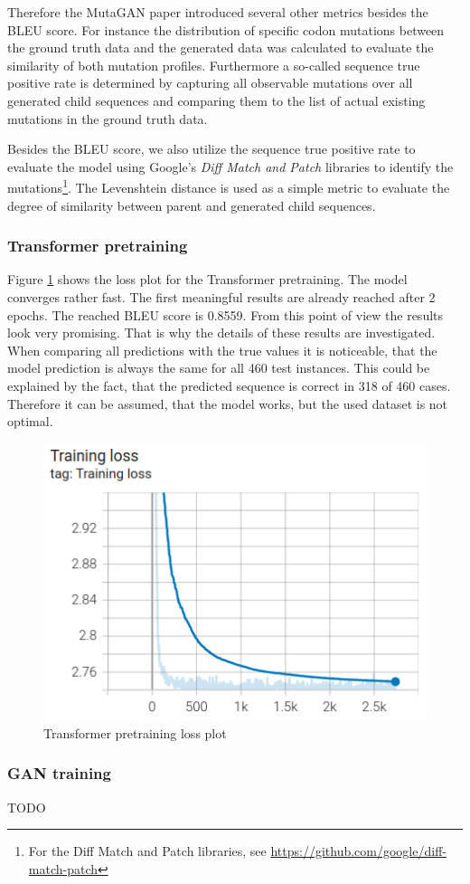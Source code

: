 Therefore the MutaGAN paper \cite{Berman2020} introduced several other metrics besides the \ac{BLEU} score. For instance the distribution of specific codon mutations between the ground truth data and the generated data was calculated to evaluate the similarity of both mutation profiles. Furthermore a so-called sequence true positive rate is determined by capturing all observable mutations over all generated child sequences and comparing them to the list of actual existing mutations in the ground truth data. 

Besides the \ac{BLEU} score, we also utilize the sequence true positive rate to evaluate the model using Google's \textit{Diff Match and Patch} libraries to identify the mutations\footnote{For the Diff Match and Patch libraries, see \url{https://github.com/google/diff-match-patch}}. The Levenshtein distance is used as a simple metric to evaluate the degree of similarity between parent and generated child sequences. 

\subsubsection{Transformer pretraining}  \label{ch:experimentsBa}

Figure \ref{pretrainingLossPlot} shows the loss plot for the Transformer pretraining. The model converges rather fast. The first meaningful results are already reached after 2 epochs. The reached BLEU score is 0.8559. From this point of view the results look very promising. That is why the details of these results are investigated. When comparing all predictions with the true values it is noticeable, that the model prediction is always the same for all 460 test instances. This could be explained by the fact, that the predicted sequence is correct in 318 of 460 cases. Therefore it can be assumed, that the model works, but the used dataset is not optimal.

\begin{figure}[ht]
	\centering
	\includegraphics[width=0.5\linewidth]{figures/pretrainingLossPlot.png}
	\caption{Transformer pretraining loss plot}
	\label{pretrainingLossPlot}
\end{figure}


\subsubsection{GAN training}  \label{ch:experimentsBb}

TODO

\newpage
